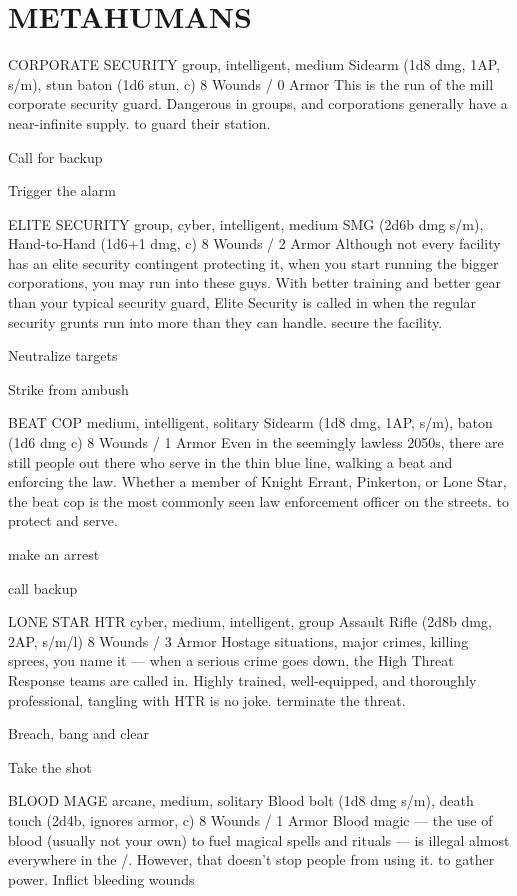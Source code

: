 \documentclass[oneside,10pt]{article}
\begin{document}
\section{METAHUMANS}
\begin{multicols}{2}

\critterspec
{CORPORATE SECURITY	 }
{group, intelligent, medium }
{Sidearm (1d8 dmg, 1AP, s/m), stun baton (1d6 stun, c) }
{8 Wounds / 0 Armor }
{This is the run of the mill corporate security guard. Dangerous in groups, and corporations generally have a near-infinite supply.}
{to guard their station. }
{\tcirc{} Call for backup 

\tcirc{} Trigger the alarm }

\critterspec
{ELITE SECURITY	}
{group, cyber, intelligent, medium }
{SMG (2d6b dmg s/m), Hand-to-Hand (1d6+1 dmg, c) }
{8 Wounds / 2 Armor }
{Although not every facility has an elite security contingent protecting it, when you start running the bigger corporations, you may run into these guys. With better training and better gear than your typical security guard, Elite Security is called in when the regular security grunts run into more than they can handle. }
{secure the facility. }
{\tcirc{} Neutralize targets 

\tcirc{} Strike from ambush }

\critterspec
{BEAT COP }
{medium, intelligent, solitary }
{Sidearm (1d8 dmg, 1AP, s/m), baton (1d6 dmg c) }
{8 Wounds / 1 Armor }
{Even in the seemingly lawless 2050s, there are still people out there who serve in the thin blue line, walking a beat and enforcing the law. Whether a member of Knight Errant, Pinkerton, or Lone Star, the beat cop is the most commonly seen law enforcement officer on the streets. }
{to protect and serve. }
{\tcirc{} make an arrest 

\tcirc{} call backup}

\critterspec
{LONE STAR HTR		}
{cyber, medium, intelligent, group}
{Assault Rifle (2d8b dmg, 2AP, s/m/l)}
{8 Wounds / 3 Armor}
{Hostage situations, major crimes, killing sprees, you name it — when a serious crime goes down, the High Threat Response teams are called in. Highly trained, well-equipped, and thoroughly professional, tangling with HTR is no joke.}
{terminate the threat.}
{\tcirc{} Breach, bang and clear

\tcirc{} Take the shot}

\critterspec
{BLOOD MAGE	}
{arcane, medium, solitary}
{Blood bolt (1d8 dmg s/m), death touch (2d4b, ignores armor, c)}
{8 Wounds / 1 Armor}
{Blood magic — the use of blood (usually not your own) to fuel magical spells and rituals — is illegal almost everywhere in the \SW/. However, that doesn’t stop people from using it.}
{to gather power.}
{  \tcirc{} Inflict bleeding wounds}


\end{multicols}
\end{document}
